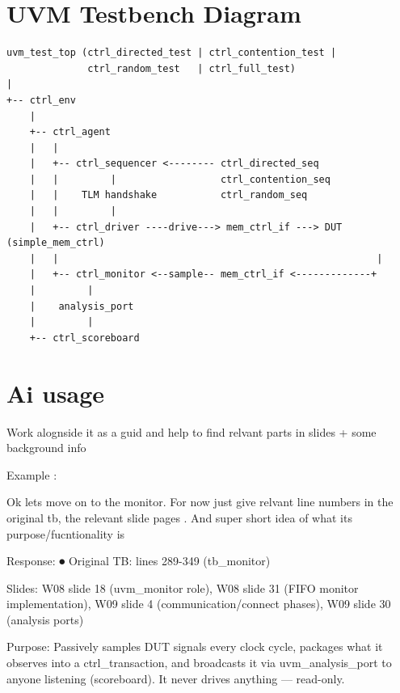 \documentclass[a4paper,11pt]{article}
\begin{document}
\newpage
\section*{UVM Testbench Diagram}

\begin{verbatim}
uvm_test_top (ctrl_directed_test | ctrl_contention_test |
              ctrl_random_test   | ctrl_full_test)
|
+-- ctrl_env
    |
    +-- ctrl_agent
    |   |
    |   +-- ctrl_sequencer <-------- ctrl_directed_seq
    |   |         |                  ctrl_contention_seq
    |   |    TLM handshake           ctrl_random_seq
    |   |         |
    |   +-- ctrl_driver ----drive---> mem_ctrl_if ---> DUT (simple_mem_ctrl)
    |   |                                                       |
    |   +-- ctrl_monitor <--sample-- mem_ctrl_if <-------------+
    |         |
    |    analysis_port
    |         |
    +-- ctrl_scoreboard
\end{verbatim}


\section*{Ai usage}




Work alognside it  as a guid and help to find relvant parts in slides + some background info

Example : 


Ok lets move on to the monitor. For now just give relvant line numbers in the original tb, the     
relevant slide pages . And super short idea of what its purpose/fucntionality is                     
                   

Response:
⏺ Original TB: lines 289-349 (tb_monitor)                                                            
                                                                                                     
  Slides: W08 slide 18 (uvm_monitor role), W08 slide 31 (FIFO monitor implementation), W09 slide 4   
  (communication/connect phases), W09 slide 30 (analysis ports)                                      
                                                                                                     
  Purpose: Passively samples DUT signals every clock cycle, packages what it observes into a         
  ctrl_transaction, and broadcasts it via uvm_analysis_port to anyone listening (scoreboard). It   
  never drives anything — read-only. 
\end{document}
